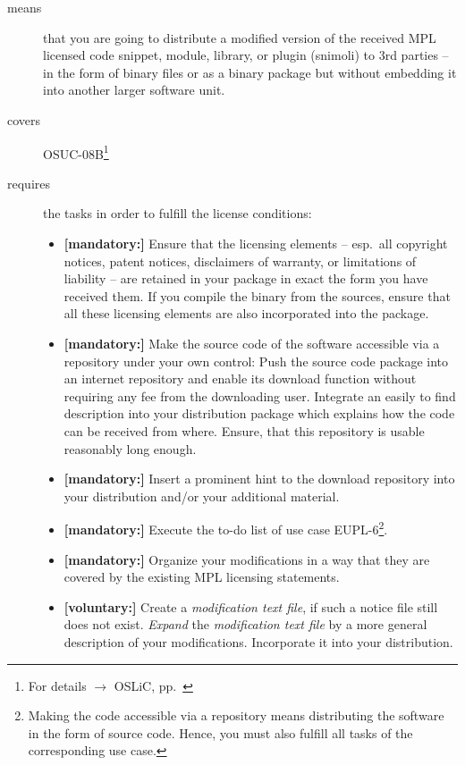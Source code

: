\begin{description}
\item[means] that you are going to distribute a modified version of the received
MPL licensed code snippet, module, library, or plugin (snimoli) to 3rd parties
-- in the form of binary files or as a binary package but without embedding it
into another larger software unit.
\item[covers] OSUC-08B\footnote{For details $\rightarrow$ OSLiC, pp.\
\pageref{OSUC-08B-DEF}}
\item[requires] the tasks in order to fulfill the license conditions:
\begin{itemize}

  \item \textbf{[mandatory:]} Ensure that the licensing elements -- esp.\ all
  copyright notices, patent notices, disclaimers of warranty, or limitations of
  liability -- are retained in your package in exact the form you have received
  them. If you compile the binary from the sources, ensure that all these
  licensing elements are also incorporated into the package.

  \item \textbf{[mandatory:]} Make the source code of the software accessible
  via a repository under your own control: Push the source code package into an
  internet repository and enable its download function without requiring any fee
  from the downloading user. Integrate an easily to find description into your
  distribution package which explains how the code can be received from where.
  Ensure, that this repository is usable reasonably long enough.
  
  \item \textbf{[mandatory:]} Insert a prominent hint to the download repository
  into your distribution and/or your additional material.

  \item \textbf{[mandatory:]} Execute the to-do list of use case EUPL-6\footnote{
  Making the code accessible via a repository means distributing the software in
  the form of source code. Hence, you must also fulfill all tasks of the
  corresponding use case.}.
  
  \item \textbf{[mandatory:]} Organize your modifications in a way that they are
  covered by the existing MPL licensing statements.
  
  \item \textbf{[voluntary:]} Create a \emph{modification text file}, if such a
  notice file still does not exist. \emph{Expand} the \emph{modification text
  file} by a more general description of your modifications. Incorporate it into
  your distribution.
  

\end{itemize}
\end{description}
